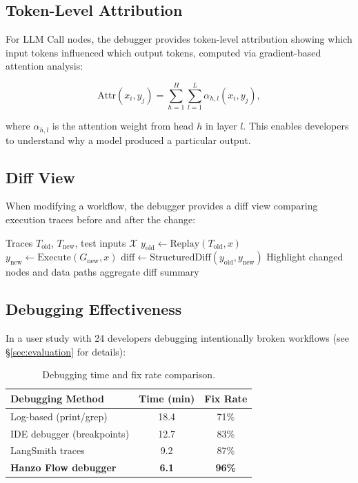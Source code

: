 \documentclass[11pt,twocolumn]{article}
\begin{document}
\subsection{Token-Level Attribution}

For LLM Call nodes, the debugger provides token-level attribution showing which input tokens influenced which output tokens, computed via gradient-based attention analysis:

\begin{equation}
\text{Attr}(x_i, y_j) = \sum_{h=1}^H \sum_{l=1}^L \alpha_{h,l}(x_i, y_j),
\end{equation}

where $\alpha_{h,l}$ is the attention weight from head $h$ in layer $l$. This enables developers to understand why a model produced a particular output.

\subsection{Diff View}

When modifying a workflow, the debugger provides a diff view comparing execution traces before and after the change:

\begin{algorithm}[H]
\caption{Execution Diff Analysis}
\label{alg:diff}
\begin{algorithmic}[1]
\Require Traces $T_{\text{old}}$, $T_{\text{new}}$, test inputs $\mathcal{X}$
    \State $y_{\text{old}} \gets \text{Replay}(T_{\text{old}}, x)$
    \State $y_{\text{new}} \gets \text{Execute}(G_{\text{new}}, x)$
    \State $\text{diff} \gets \text{StructuredDiff}(y_{\text{old}}, y_{\text{new}})$
    \State Highlight changed nodes and data paths
\EndFor
\State \Return aggregate diff summary
\end{algorithmic}
\end{algorithm}

\subsection{Debugging Effectiveness}

In a user study with 24 developers debugging intentionally broken workflows (see \S\ref{sec:evaluation} for details):

\begin{table}[H]
\centering
\small
\begin{tabular}{lcc}
\toprule
\textbf{Debugging Method} & \textbf{Time (min)} & \textbf{Fix Rate} \\
\midrule
Log-based (print/grep) & 18.4 & 71\% \\
IDE debugger (breakpoints) & 12.7 & 83\% \\
LangSmith traces & 9.2 & 87\% \\
\textbf{Hanzo Flow debugger} & \textbf{6.1} & \textbf{96\%} \\
\bottomrule
\end{tabular}
\caption{Debugging time and fix rate comparison.}
\label{tab:debug}
\end{table}
\end{document}
